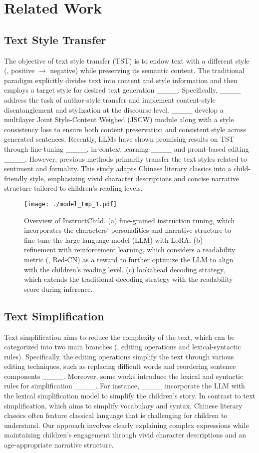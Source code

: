 \section{Related Work}
\subsection{Text Style Transfer}
The objective of text style transfer (TST) is to endow text with a different style (\eg, positive $\rightarrow$ negative) while preserving its semantic content. 
The traditional paradigm explicitly divides text into content and style information and then employs a target style for desired text generation ____.
Specifically, ____ address the task of author-style transfer and implement content-style disentanglement and stylization at the discourse level.
____ develop a multilayer Joint Style-Content Weighed (JSCW) module along with a style consistency loss to ensure both content preservation and consistent style across generated sentences.
Recently, LLMs have shown promising results on TST through fine-tuning ____, in-context learning ____ and promt-based editing ____.
However, previous methods primarily transfer the text styles related to sentiment and formality.
This study adapts Chinese literary classics into a child-friendly style, emphasizing vivid character descriptions and concise narrative structure tailored to children’s reading levels.
\begin{figure*}[]
  \centering
  \texttt{[image: ./model\_tmp\_1.pdf]}
  \caption{Overview of InstructChild.
  (a) fine-grained instruction tuning, which incorporates the characters' personalities and narrative structure to fine-tune the large language model (LLM) with LoRA.
  (b) refinement with reinforcement learning, which considers a readability metric (\ie, Red-CN) as a reward to further optimize 
  the LLM to align with the children's reading level.
  (c) lookahead decoding strategy, which extends the traditional decoding strategy with the readability score during inference. } 
  \label{framework}
\end{figure*}


\subsection{Text Simplification}
Text simplification aims to reduce the complexity of the text, 
which can be categorized into two main branches (\ie, editing operations and lexical-syntactic rules).
Specifically, 
the editing operations simplify the text through various editing techniques, such as replacing difficult words and reordering sentence components ____. 
Moreover, some works introduce the lexical and syntactic rules for simplification ____.
For instance, ____ incorporate the LLM with the lexical simplification model to simplify the children's story.
In contrast to text simplification, which aims to simplify vocabulary and syntax, Chinese literary classics often feature classical language that is challenging for children to understand. 
Our approach involves clearly explaining complex expressions while maintaining children's engagement through vivid character descriptions and an age-appropriate narrative structure.